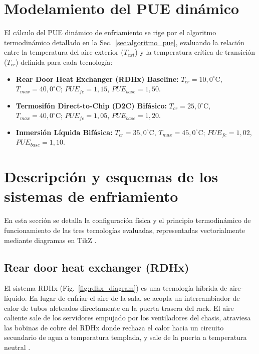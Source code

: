\section{Modelamiento del PUE din\'amico}\label{sec:modelamiento_pue_dinamico}
El c\'alculo del PUE din\'amico de enfriamiento se rige por el algoritmo termodin\'amico detallado en la Sec.~\ref{sec:algoritmo_pue}, evaluando la relaci\'on entre la temperatura del aire exterior ($T_{ext}$) y la temperatura cr\'itica de transici\'on ($T_{cr}$) definida \cite{greengrid2008} para cada tecnolog\'ia:
\begin{itemize}
    \item \textbf{Rear Door Heat Exchanger (RDHx) Baseline:} $T_{cr} = 10,0^\circ\text{C}$, $T_{max} = 40,0^\circ\text{C}$; $PUE_{fc} = 1,15$, $PUE_{base} = 1,50$.
    \item \textbf{Termosif\'on Direct-to-Chip (D2C) Bif\'asico:} $T_{cr} = 25,0^\circ\text{C}$, $T_{max} = 40,0^\circ\text{C}$; $PUE_{fc} = 1,05$, $PUE_{base} = 1,20$.
    \item \textbf{Inmersi\'on L\'iquida Bif\'asica:} $T_{cr} = 35,0^\circ\text{C}$, $T_{max} = 45,0^\circ\text{C}$; $PUE_{fc} = 1,02$, $PUE_{base} = 1,10$.
\end{itemize}

\section{Descripci\'on y esquemas de los sistemas de enfriamiento}
En esta secci\'on se detalla la configuraci\'on f\'isica y el principio termodin\'amico de funcionamiento de las tres tecnolog\'ias evaluadas, representadas vectorialmente mediante diagramas en TikZ \cite{garrity2014}.

\subsection{Rear door heat exchanger (RDHx)}
El sistema RDHx (Fig.~\ref{fig:rdhx_diagram}) es una tecnolog\'ia h\'ibrida de aire-l\'iquido. En lugar de enfriar el aire de la sala, se acopla un intercambiador de calor de tubos aleteados directamente en la puerta trasera del rack. El aire caliente sale de los servidores empujado por los ventiladores del chasis, atraviesa las bobinas de cobre del RDHx donde rechaza el calor hacia un circuito secundario de agua a temperatura templada, y sale de la puerta a temperatura neutral \cite{ashrae2021}.

